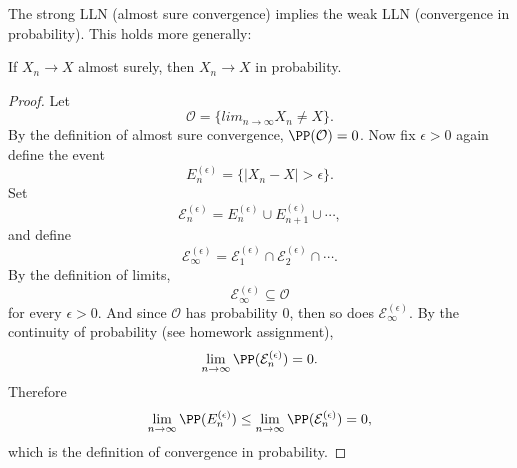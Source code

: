 \documentclass{ximera}
\begin{document}
The strong LLN (almost sure convergence) implies the weak LLN (convergence in probability). This holds more generally:

\begin{theorem}
If $X_n\rightarrow X$ almost surely, then $X_n \rightarrow X$ in probability.
\end{theorem}
\begin{proof}
Let $$\mathcal{O} = \{lim_{n\rightarrow\infty} X_n \neq X\}.$$ 
By the definition of almost sure convergence, $\PP(\mathcal{O})=0$. Now fix $\epsilon>0$ again define the event
$$
E_n^{(\epsilon)} = \{ \vert X_n - X\vert> \epsilon\}.
$$
Set
$$
\mathcal{E}_n^{(\epsilon)} = E_n^{(\epsilon)} \cup E_{n+1}^{(\epsilon)} \cup \cdots,
$$
and define
$$
\mathcal{E}_{\infty}^{(\epsilon)} = \mathcal{E}_1^{(\epsilon)} \cap \mathcal{E}_2^{(\epsilon)} \cap \cdots.
$$
By the definition of limits, 
$$
\mathcal{E}_{\infty}^{(\epsilon)} \subseteq \mathcal{O}
$$
for every $\epsilon>0$. And since $\mathcal{O}$ has probability $0$, then so does $\mathcal{E}_{\infty}^{(\epsilon)} $. By the continuity of probability (see homework assignment),
$$
\lim_{n\rightarrow \infty} \PP(\mathcal{E}_{n}^{(\epsilon)} ) =0.
$$
Therefore
$$
\lim_{n\rightarrow \infty} \PP(E_n^{(\epsilon)} ) \leq \lim_{n\rightarrow \infty} \PP(\mathcal{E}_{n}^{(\epsilon)} ) = 0,
$$
which is the definition of convergence in probability.
\end{proof}
\end{document}
